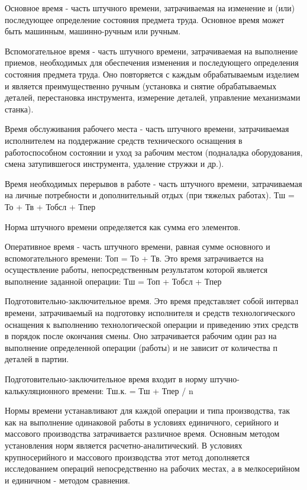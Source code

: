 \documentclass[unicode, 12pt, a4paper, oneside]{article}
\begin{document}
Основное время - часть штучного времени, затрачиваемая на изменение и (или) последующее определение состояния предмета труда. Основное время может быть машинным, машинно-ручным или ручным.

Вспомогательное время - часть штучного времени, затрачиваемая на выполнение приемов, необходимых для обеспечения изменения и последующего определения состояния предмета труда. Оно повторяется с каждым обрабатываемым изделием и является преимущественно ручным (установка и снятие обрабатываемых деталей, перестановка инструмента, измерение деталей, управление механизмами станка).

Время обслуживания рабочего места - часть штучного времени, затрачиваемая исполнителем на поддержание средств технического оснащения в работоспособном состоянии и уход за рабочим местом (подналадка оборудования, смена затупившегося инструмента, удаление стружки и др.).

Время необходимых перерывов в работе - часть штучного времени, затрачиваемая на личные потребности и дополнительный отдых (при тяжелых работах). Тш = То + Тв + Тобсл + Тпер

Норма штучного времени определяется как сумма его элементов.

Оперативное время - часть штучного времени, равная сумме основного и вспомогательного времени: Топ = То + Тв. Это время затрачивается на осуществление работы, непосредственным результатом которой является выполнение заданной операции: Тш = Топ + Тобсл + Тпер

Подготовительно-заключительное время. Это время представляет собой интервал времени, затрачиваемый на подготовку исполнителя и средств технологического оснащения к выполнению технологической операции и приведению этих средств в порядок после окончания смены. Оно затрачивается рабочим один раз на выполнение определенной операции (работы) и не зависит от количества п деталей в партии.

Подготовительно-заключительное время входит в норму штучно-калькуляционного времени: Тш.к. = Тш + Тпер / n

Нормы времени устанавливают для каждой операции и типа производства, так как на выполнение одинаковой работы в условиях единичного, серийного и массового производства затрачивается различное время. Основным методом установления норм является расчетно-аналитический. В условиях крупносерийного и массового производства этот метод дополняется исследованием операций непосредственно на рабочих местах, а в мелкосерийном и единичном - методом сравнения.
\end{document}
